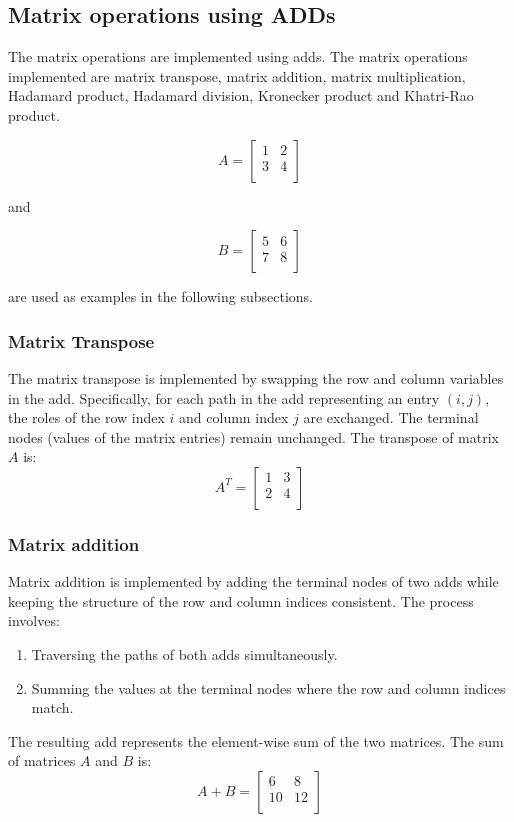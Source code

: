 \subsection{Matrix operations using ADDs}\label{subsec:matrix-operations-using-adds}
The matrix operations are implemented using \glspl{add}.
The matrix operations implemented are matrix transpose, matrix addition, matrix multiplication, Hadamard product, Hadamard division, Kronecker product and Khatri-Rao product.

\[
    A = \begin{bmatrix}
            1 & 2 \\
            3 & 4 \\
    \end{bmatrix}
\]

and

\[
    B = \begin{bmatrix}
            5 & 6 \\
            7 & 8 \\
    \end{bmatrix}
\]

are used as examples in the following subsections.

\subsubsection{Matrix Transpose}
The matrix transpose is implemented by swapping the row and column variables in the \gls{add}. Specifically, for each path in the \gls{add} representing an entry $(i, j)$, the roles of the row index 
$i$ and column index $j$ are exchanged. The terminal nodes (values of the matrix entries) remain unchanged.
The transpose of matrix $A$ is:
\[
    A^T = \begin{bmatrix}
              1 & 3 \\
              2 & 4 \\
    \end{bmatrix}
\]

\subsubsection{Matrix addition}
Matrix addition is implemented by adding the terminal nodes of two \glspl{add} while keeping the structure of the row and column indices consistent. The process involves:
\begin{enumerate}
    \item Traversing the paths of both \glspl{add} simultaneously.
    \item Summing the values at the terminal nodes where the row and column indices match.
\end{enumerate}
The resulting \gls{add} represents the element-wise sum of the two matrices.
The sum of matrices $A$ and $B$ is:
\[
    A + B = \begin{bmatrix}
        6  & 8  \\
        10 & 12 \\
    \end{bmatrix}
\]

